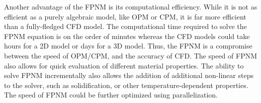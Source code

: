 \documentclass[%
 aip,
 amsmath,amssymb,
 reprint,%
]{revtex4-1}
\begin{document}
Another advantage of the FPNM is its computational efficiency. While it is not as efficient as a purely algebraic model, like OPM or CPM, it is far more efficient than a fully-fledged CFD model. The computational time required to solve the FPNM equation is on the order of minutes whereas the CFD models could take hours for a 2D model or days for a 3D model. Thus, the FPNM is a compromise between the speed of OPM/CPM, and the accuracy of CFD. The speed of FPNM also allows for quick evaluation of different material properties. The ability to solve FPNM incrementally also allows the addition of additional non-linear steps to the solver, such as solidification, or other temperature-dependent properties. The speed of FPNM could be further optimized using parallelization. 



\end{document}
